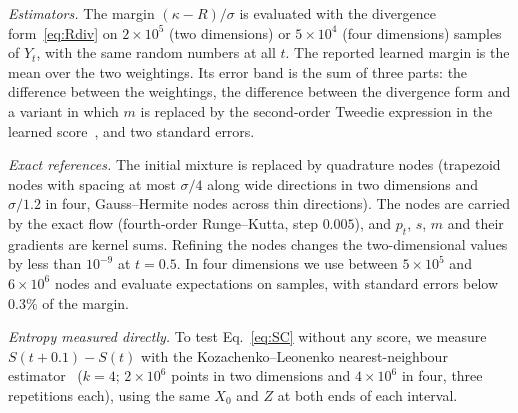 \emph{Estimators.} The margin $(\kappa - R)/\sigma$ is evaluated with the divergence form~\eqref{eq:Rdiv} on $2\times10^5$ (two dimensions) or $5\times10^4$ (four dimensions) samples of $Y_t$, with the same random numbers at all $t$. The reported learned margin is the mean over the two weightings. Its error band is the sum of three parts: the difference between the weightings, the difference between the divergence form and a variant in which $m$ is replaced by the second-order Tweedie expression in the learned score~\cite{efron2011}, and two standard errors.

\emph{Exact references.} The initial mixture is replaced by quadrature nodes (trapezoid nodes with spacing at most $\sigma/4$ along wide directions in two dimensions and $\sigma/1.2$ in four, Gauss--Hermite nodes across thin directions). The nodes are carried by the exact flow (fourth-order Runge--Kutta, step $0.005$), and $p_t$, $s$, $m$ and their gradients are kernel sums. Refining the nodes changes the two-dimensional values by less than $10^{-9}$ at $t = 0.5$. In four dimensions we use between $5\times10^5$ and $6\times10^6$ nodes and evaluate expectations on samples, with standard errors below $0.3\%$ of the margin.

\emph{Entropy measured directly.} To test Eq.~\eqref{eq:SC} without any score, we measure $S(t+0.1) - S(t)$ with the Kozachenko--Leonenko nearest-neighbour estimator~\cite{kozachenko1987} ($k = 4$; $2\times10^6$ points in two dimensions and $4\times10^6$ in four, three repetitions each), using the same $X_0$ and $Z$ at both ends of each interval.
